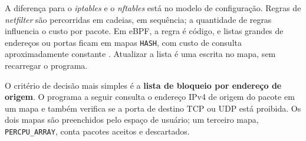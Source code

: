 A diferença para o \textit{iptables} e o \textit{nftables} está no modelo de
configuração. Regras de \textit{netfilter} são percorridas em cadeias, em sequência;
a quantidade de regras influencia o custo por pacote. Em eBPF, a regra é código, e
listas grandes de endereços ou portas ficam em mapas \texttt{HASH}, com custo de
consulta aproximadamente constante \cite{gregg2019}. Atualizar a lista é uma escrita
no mapa, sem recarregar o programa.

O critério de decisão mais simples é a \textbf{lista de bloqueio por endereço de
origem}. O programa a seguir consulta o endereço IPv4 de origem do pacote em um mapa
e também verifica se a porta de destino TCP ou UDP está proibida. Os dois mapas são
preenchidos pelo espaço de usuário; um terceiro mapa, \texttt{PERCPU\_ARRAY}, conta
pacotes aceitos e descartados.

